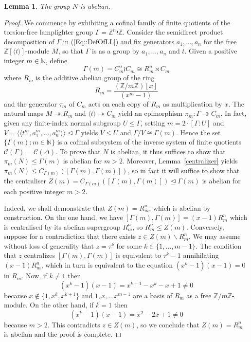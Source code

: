 \documentclass{amsart}
\numberwithin{theorem}{section}
\numberwithin{equation}{section}
\newtheorem{lemma}[theorem]{Lemma}
\newcommand{\Z}{\mathbb{Z}}
\begin{document}
\begin{lemma}\label{Lem::Abelian} The group $N$ is abelian.
\end{lemma}

\begin{proof} We commence by exhibiting a cofinal family of finite quotients of the torsion-free lamplighter group $\Gamma = \Z^n \wr \Z$. Consider the semidirect product decomposition of $\Gamma$ in (\ref{Eq::DefOfLL}) and fix generators $a_1, \ldots, a_n$ for the free $\Z[\langle t \rangle]$-module $M$, so that $\Gamma$ is as a group by $a_1, \ldots, a_n$ and $t$. Given a positive integer $m \in \mathbb{N}$, define
\[
\Gamma(m) = C_m^n \wr C_m \cong R_m^n \rtimes C_m
\] where $R_m$ is the additive abelian group of the ring
\[
R_m = \frac{(\Z/m\Z)[x]}{(x^m - 1)}
\]
and the generator $\tau_m$ of $C_m$ acts on each copy of $R_m$ as multiplication by $x$. The natural maps $M \twoheadrightarrow R_m$ and $\langle t \rangle \twoheadrightarrow C_m$ yield an epimorphism $\pi_m \colon \Gamma \twoheadrightarrow C_m$. In fact, given any finite-index normal subgroup $U \trianglelefteq \Gamma$, setting $m = 2\cdot [\Gamma : U]$ and $V = \langle \langle t^m,a_1^m,\ldots, a_n^m\rangle \rangle \trianglelefteq \Gamma$ yields $V \leq U$ and $\Gamma / V \cong \Gamma(m)$. Hence the set $\{\Gamma(m) : m \in \mathbb{N}\}$ is a cofinal subsystem of the inverse system of finite quotients $\mathcal{C}(\Gamma) = \mathcal{C}(\Delta)$. To prove that $N$ is abelian, it thus suffices to show that $\pi_m(N) \leq \Gamma(m)$ is abelian for $m > 2$.
Moreover, Lemma~\ref{centralizer} yields $\pi_m(N) \leq C_{\Gamma(m)}([\Gamma(m), \Gamma(m)])$, so in fact it will suffice to show that the centraliser $Z(m) = C_{\Gamma(m)}([\Gamma(m), \Gamma(m)]) \trianglelefteq \Gamma(m)$ is abelian for each positive integer $m > 2$.

Indeed, we shall demonstrate that $Z(m) = R_m^n$, which is abelian by construction. On the one hand, we have $[\Gamma(m), \Gamma(m)] = (x-1) R_m^n$ which is centralised by its abelian supergroup $R_m^n$, so $R_m^n \leq Z(m)$. Conversely, suppose for a contradiction that there exists $z \in Z(m) \backslash R_m^n$. We may assume without loss of generality that $z=\tau^k$ for some $k \in \{1, \ldots, m-1\}$. The condition that $z$ centralizes $[\Gamma(m),\Gamma(m)]$ is equivalent to $\tau^k-1$ annihilating $(x-1)R_m^n$, which in turn is equivalent to the equation $(x^k-1)(x-1)=0$ in $R_m$. Now, if $k \neq 1$ then
\[
(x^k-1)(x-1)=x^{k+1}-x^k-x+1 \neq 0
\] because $x \not \in \{1,x^k,x^{k+1}\}$ and $1,x, \ldots x^{m-1}$ are a basis of $R_m$ as a free $\Z/m\Z$-module. On the other hand, if $k = 1$ then \[
(x^k-1)(x-1)=x^2 -2x+1 \not =0
\]
because $m>2$. This contradicts $z \in Z(m)$, so we conclude that $Z(m) = R_m^n$ is abelian and the proof is complete.
\end{proof}
\end{document}
